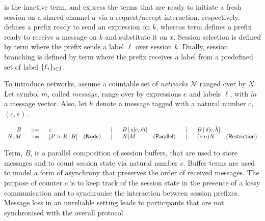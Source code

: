 %

\Inact is the inactive term. \Request and \Accept express the
terms that are ready to initiate a fresh session on a shared channel $a$
via a request/accept interaction, respectively.
%
\Send defines a prefix ready to send an expression
on $k$, whereas term \Rcv defines a prefix ready to receive
a message on $k$ and substitute it on $x$.
%
Session selection is defined by term \Selection where
the prefix sends a label $\ell$ over session $k$.
Dually, session branching is defined by term \Branching
where the prefix receives a label from a predefined
set of label $\{\ell_i\}_{i \in I}$.

To introduce networks, assume a countable set of {\em networks}
$\mathcal N$ ranged over by $N$. Let symbol $m$, called
{\em message}, range over by expressions $e$ and labels $\ell$,
with $\tilde{m}$ a message vector. Also, let $h$ denote a message
tagged with a natural number $c$, $(c, e)$.
%

\noindent
$
	\begin{array}{rclrclrclr}
		B	&\ \ ::=\ \ &	\varepsilon & &\ \ |\ \ & B \,|\, s[c, \tilde{m}]&  &\ \ |\ \ & B \,|\, \breve{s}[c, \tilde{h}] &
		\\
		N, M	&\ \ ::=\ \ &	[P \,\triangleright\, R \,|\, B] &\mathsf{{\displaystyle (Node)}} &\ \ |\ \ & N | M &\mathsf{{\displaystyle (Parallel)}} &\ \ |\ \ & (\nu\,n) N& \mathsf{{\displaystyle (Restriction)}}
	\end{array}
$

%
Term, $B$, is a parallel composition of session
buffers, that are used to store messages and to count
session state via natural number $c$.
Buffer terms are used to model a form of asynchrony that
preserves the order of received messages.
%
The purpose of counter $c$ is to keep track of the
session state in the presence of a lossy communication
and to synchronise the interaction between session prefixes.
%
Message loss in an unreliable setting leads to
participants that are not synchronised with the
overall protocol.
%
%

